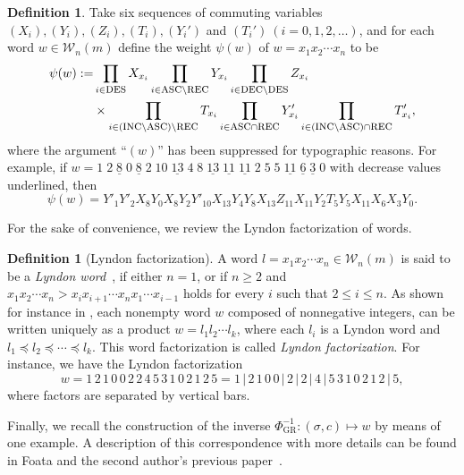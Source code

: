 \documentclass[12pt]{amsart} %
\numberwithin{equation}{section}
\theoremstyle{plain}
\theoremstyle{definition}
\newtheorem{Def}[theorem]{Definition}
\def\DES{\hbox{\rm\textsc{des}}}
\def\DEC{\hbox{\rm\textsc{dec}}}
\def\INC{\hbox{\rm\textsc{inc}}}
\def\REC{\hbox{\rm\textsc{rec}}}
\def\W{\mathcal{W}}
\def\ASC{\hbox{\rm\textsc{asc}}}
\def\U{\underline}
\begin{document}
\begin{Def}\label{weight:psi}
Take six sequences of commuting variables $(X_i), (Y_i), (Z_i), (T_i), (Y_i')$ and $(T_i')~(i=0,1,2,\ldots)$, and for each word $w\in\W_n(m)$ define the weight $\psi(w)$ of $w=x_1x_2\cdots x_n$ to be
\begin{align}
\psi(w):=& \prod_{i\in\DES}X_{x_i}\prod_{i\in\ASC\backslash\REC}Y_{x_i}\prod_{i\in\DEC\backslash\DES}Z_{x_i}\\
&\times\prod_{i\in(\INC\backslash\ASC)\backslash\REC}T_{x_i}\prod_{i\in\ASC\cap\REC}Y_{x_i}'\prod_{i\in(\INC\backslash\ASC)\cap\REC}T_{x_i}',\nonumber
\end{align}
where the argument ``$(w)$'' has been suppressed for typographic reasons. For example, if $w=1\;2\;\U{8}\;0\;\U{8}\;2\;10\; \U{13}\;4\;8\; \U{13}\;\U{11}\;\U{11}\;2\;5\;5\; \U{11}\;\U{6}\; \U{3}\;0$ with decrease values underlined, then 
\begin{equation}\label{exm:psi}
\psi(w)=Y'_1Y'_2X_8Y_0X_8Y_2Y'_{10}X_{13}Y_4Y_8X_{13}Z_{11}X_{11}Y_2T_5Y_5X_{11}X_6X_3Y_0.
\end{equation}
\end{Def}

For the sake of convenience, we review the Lyndon factorization of words.
\begin{Def}[Lyndon factorization]
A word $l=x_1x_2\cdots x_n\in\W_n(m)$ is said to be a {\em Lyndon word}~\cite{fh3,lo}, if either $n=1$, or if $n\ge 2$ and $x_1x_2\cdots x_n>x_ix_{i+1}\cdots x_nx_1\cdots x_{i-1}$ holds for every $i$ such that $2\le i\le n$. As shown for instance in \cite[Theorem~5.1.5]{lo}, each nonempty word $w$ composed of nonnegative integers, can be written uniquely as a product $w=l_1l_2\cdots l_k$, where each $l_i$ is a Lyndon word and $l_1\preceq l_2\preceq \cdots\preceq l_k$. This word factorization is called  {\em Lyndon factorization}. For instance, we have the Lyndon factorization 
$$
w=1\,2\,1\,0\,0\,2\,2\,4\,5\,3\,1\,0\,2\,1\,2\,5=1\,|\,2\,1\,0\,0\,|\,2\,|\,2\,|\,4\,|\,5\,3\,1\,0\,2\,1\,2\,|\,5,
$$
where factors are separated by vertical bars. 
\end{Def}
Finally, we recall the construction of the inverse $\Phi_{\mathrm{GR}}^{-1}:(\sigma,c)\mapsto w$ by means of one example. A description of this correspondence with more details can be found in Foata and the second author's previous paper~\cite{fh3}.
\end{document}
